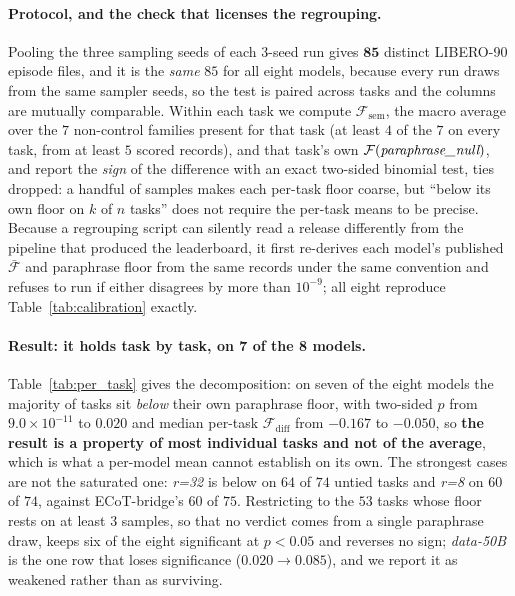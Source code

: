 \documentclass{article}
\begin{document}
\paragraph{Protocol, and the check that licenses the regrouping.} Pooling the three sampling seeds of each 3-seed run gives $\mathbf{85}$ distinct LIBERO-90 episode files, and it is the \emph{same} $85$ for all eight models, because every run draws from the same sampler seeds, so the test is paired across tasks and the columns are mutually comparable. Within each task we compute $\mathcal{F}_{\text{sem}}$, the macro average over the $7$ non-control families present for that task (at least $4$ of the $7$ on every task, from at least $5$ scored records), and that task's own $\mathcal{F}(\emph{paraphrase\_null})$, and report the \emph{sign} of the difference with an exact two-sided binomial test, ties dropped: a handful of samples makes each per-task floor coarse, but ``below its own floor on $k$ of $n$ tasks'' does not require the per-task means to be precise. Because a regrouping script can silently read a release differently from the pipeline that produced the leaderboard, it first re-derives each model's published $\bar{\mathcal{F}}$ and paraphrase floor from the same records under the same convention and refuses to run if either disagrees by more than $10^{-9}$; all eight reproduce Table~\ref{tab:calibration} exactly.

\paragraph{Result: it holds task by task, on 7 of the 8 models.} Table~\ref{tab:per_task} gives the decomposition: on seven of the eight models the majority of tasks sit \emph{below} their own paraphrase floor, with two-sided $p$ from $9.0\!\times\!10^{-11}$ to $0.020$ and median per-task $\mathcal{F}_{\text{diff}}$ from $-0.167$ to $-0.050$, so \textbf{the result is a property of most individual tasks and not of the average}, which is what a per-model mean cannot establish on its own. The strongest cases are not the saturated one: \emph{r=32} is below on $64$ of $74$ untied tasks and \emph{r=8} on $60$ of $74$, against ECoT-bridge's $60$ of $75$. Restricting to the $53$ tasks whose floor rests on at least $3$ samples, so that no verdict comes from a single paraphrase draw, keeps six of the eight significant at $p<0.05$ and reverses no sign; \emph{data-50B} is the one row that loses significance ($0.020 \to 0.085$), and we report it as weakened rather than as surviving.
\end{document}
